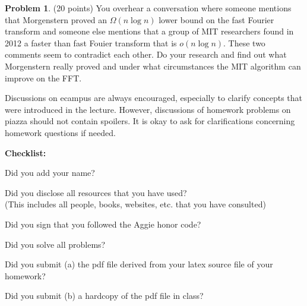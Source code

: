 \documentclass{article}
\theoremstyle{definition}
\newtheorem{problem}{Problem}
\newcommand{\checklist}{\noindent\textbf{Checklist:}
\begin{compactitem}[$\Box$] 
\item Did you add your name? 
\item Did you disclose all resources that you have used? \\
(This includes all people, books, websites, etc. that you have consulted)
\item Did you sign that you followed the Aggie honor code? 
\item Did you solve all problems? 
\item Did you submit (a) the pdf file derived from your latex source file
  of your homework?
\item Did you submit (b) a hardcopy of the pdf file in class? 
\end{compactitem}
}
\begin{document}
\begin{problem} (20 points) You overhear a conversation where someone
  mentions that Morgenstern proved an $\Omega(n\log n)$ lower bound on
  the fast Fourier transform and someone else mentions that a group of
  MIT researchers found in 2012 a faster than fast Fouier transform
  that is $o(n\log n)$. These two comments seem to contradict each
  other. Do your research and find out what Morgenstern really proved
  and under what circumstances the MIT algorithm can improve on the
  FFT.
\end{problem}




Discussions on ecampus are always encouraged, especially to clarify
concepts that were introduced in the lecture. However, discussions of
homework problems on piazza should not contain spoilers. It is okay to
ask for clarifications concerning homework questions if needed. 
\medskip



\goodbreak
\checklist
\end{document}
